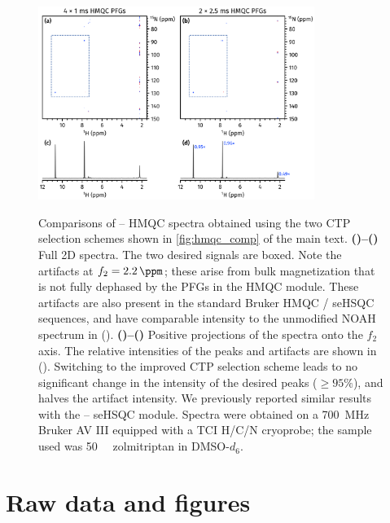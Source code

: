 \documentclass[a4paper,11pt]{article}
\newcommand{\proton}{\ch{^{1}H}}
\newcommand{\nitrogen}{\ch{^{15}N}}
\newcommand{\HN}{\proton{}--\nitrogen{}}
\newcommand*{\zolmi}{Spectra were obtained on a \SI{700}{\MHz} Bruker AV III equipped with a TCI H/C/N cryoprobe; the sample used was \SI{50}{\milli\molar} zolmitriptan in DMSO-\(d_6\).}
\begin{document}
\begin{refsection}
\begin{figure}[H]
    \centering
    \includegraphics[width=0.8\textwidth]{hmqc_comp_snr.png}
    {\label{fig:hmqc_comp_snr_bad2d}}
    {\label{fig:hmqc_comp_snr_good2d}}
    {\label{fig:hmqc_comp_snr_bad1d}}
    {\label{fig:hmqc_comp_snr_good1d}}
    \caption{
        Comparisons of \HN{} HMQC spectra obtained using the two CTP selection schemes shown in \cref{fig:hmqc_comp} of the main text.
        \textbf{()--()} Full 2D spectra.
        The two desired signals are boxed.
        Note the artifacts at \(f_2 = \SI{2.2}{\ppm}\); these arise from bulk magnetization that is not fully dephased by the PFGs in the HMQC module.\autocite{Yong2021JMR}
        These artifacts are also present in the standard Bruker HMQC / seHSQC sequences, and have comparable intensity to the unmodified NOAH spectrum in ().
        \textbf{()--()} Positive projections of the spectra onto the \(f_2\) axis.
        The relative intensities of the peaks and artifacts are shown in ().
        Switching to the improved CTP selection scheme leads to no significant change in the intensity of the desired peaks (\(\geq 95\%\)), and halves the artifact intensity.
        We previously reported similar results with the \HN{} seHSQC module.\autocite{Yong2021JMR}
        \zolmi{}
    }
    \label{fig:hmqc_comp_snr}
\end{figure}

\clearpage
\section{Raw data and figures}
\label{sec:si_raw_data}


\end{refsection}
\end{document}
